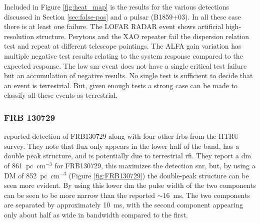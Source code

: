 \documentclass[a4paper,fleqn,usenatbib]{mnras}
\begin{document}
Included in Figure \ref{fig:heat_map} is the results for the various detections
discussed in Section \ref{sec:false-pos} and a pulsar (B1859+03). In all these
case there is at least one failure.  The LOFAR RADAR event shows artificial
high-resolution structure.  Perytons and the XAO repeater fail the dispersion
relation test and repeat at different telescope pointings. The ALFA gain
variation has multiple negative test results relating to the system response
compared to the expected response.  The low \gls{snr} event does not have a
single critical test failure but an accumulation of negative results.  No single
test is sufficient to decide that an event is terrestrial. But, given enough
tests a strong case can be made to classify all these events as terrestrial.









\subsubsection{FRB 130729}

\cite{2016MNRAS.460L..30C} reported detection of FRB130729 along with four other
\glspl{frb} from the HTRU survey. They note that flux only appears in the lower
half of the band, has a double peak structure, and is potentially due to
terrestrial \gls{rfi}.  They report a \gls{dm} of 861~pc~cm$^{-3}$ for
FRB130729, this maximizes the detection \gls{snr}, but, by using a DM of
852~pc~cm$^{-3}$ (Figure \ref{fig:FRB130729}) the double-peak structure can be
seen more evident. By using this lower \gls{dm} the pulse width of the two
components can be seen to be more narrow than the reported $\sim 16$~ms.
The two components are separated by approximately 10~ms, with the second
component appearing only about half as wide in bandwidth compared to the first. 
\end{document}
